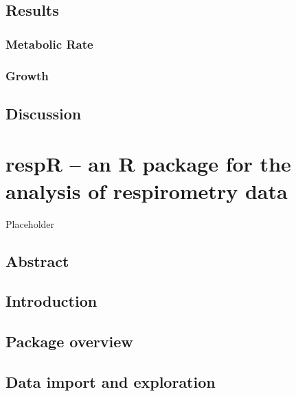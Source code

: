 \documentclass[
  oneside, 11pt, a4paper]{memoir}
\begin{document}
\hypertarget{results-2}{%
\section{Results}\label{results-2}}

\hypertarget{metabolic-rate-4}{%
\subsection{Metabolic Rate}\label{metabolic-rate-4}}

\hypertarget{growth}{%
\subsection{Growth}\label{growth}}

\hypertarget{discussion-2}{%
\section{Discussion}\label{discussion-2}}

\hypertarget{chapter5}{%
\chapter{respR -- an R package for the analysis of respirometry data}\label{chapter5}}

Placeholder

\hypertarget{abstract-3}{%
\section*{Abstract}\label{abstract-3}}

\hypertarget{introduction-3}{%
\section{Introduction}\label{introduction-3}}

\hypertarget{package-overview}{%
\section{Package overview}\label{package-overview}}

\hypertarget{data-import-and-exploration}{%
\section{Data import and exploration}\label{data-import-and-exploration}}
\end{document}
